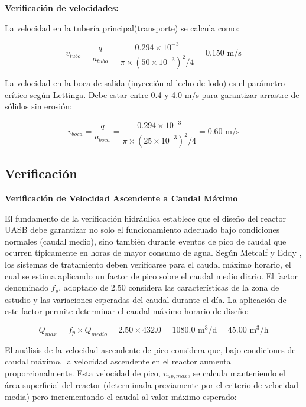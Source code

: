 \textbf{Verificación de velocidades:}

La velocidad en la tubería principal(transporte) se calcula como:

\begin{equation}
v_{tubo} = \frac{q}{a_{tubo}} = \frac{0.294 \times 10^{-3}}{\pi \times (50 \times 10^{-3})^2 / 4} = 0.150 \text{ m/s}
\end{equation}

La velocidad en la boca de salida (inyección al lecho de lodo) es el parámetro crítico según Lettinga. Debe estar entre 0.4 y 4.0 m/s para garantizar arrastre de sólidos sin erosión:

\begin{equation}
v_{boca} = \frac{q}{a_{boca}} = \frac{0.294 \times 10^{-3}}{\pi \times (25 \times 10^{-3})^2 / 4} = 0.60 \text{ m/s}
\end{equation}

\subsection{Verificación}

\textbf{Verificación de Velocidad Ascendente a Caudal Máximo}

El fundamento de la verificación hidráulica establece que el diseño del reactor UASB debe garantizar no solo el funcionamiento adecuado bajo condiciones normales (caudal medio), sino también durante eventos de pico de caudal que ocurren típicamente en horas de mayor consumo de agua. Según Metcalf y Eddy \cite{metcalf2014}, los sistemas de tratamiento deben verificarse para el caudal máximo horario, el cual se estima aplicando un factor de pico sobre el caudal medio diario. El factor denominado $f_p$, adoptado de 2.50 considera las características de la zona de estudio y las variaciones esperadas del caudal durante el día. La aplicación de este factor permite determinar el caudal máximo horario de diseño:

\begin{equation}
Q_{max} = f_p \times Q_{medio} = 2.50 \times 432.0 = 1080.0 \text{ m}^3\text{/d} = 45.00 \text{ m}^3\text{/h}
\end{equation}

El análisis de la velocidad ascendente de pico considera que, bajo condiciones de caudal máximo, la velocidad ascendente en el reactor aumenta proporcionalmente. Esta velocidad de pico, $v_{up,max}$, se calcula manteniendo el área superficial del reactor (determinada previamente por el criterio de velocidad media) pero incrementando el caudal al valor máximo esperado:

